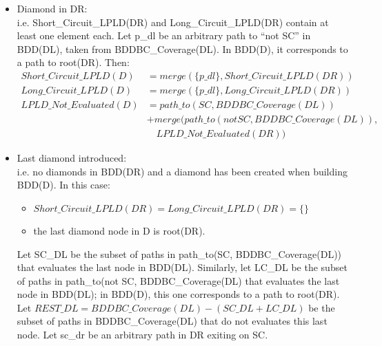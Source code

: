 \documentclass[a4paper,12pt,twoside]{article}
\begin{document}
\begin{description}
\begin{itemize}
  \item Diamond in DR:\\
    i.e. Short\_Circuit\_LPLD(DR) and Long\_Circuit\_LPLD(DR) contain at least
    one element each.
    Let p\_dl be an arbitrary path to ``not SC'' in BDD(DL), taken from
    BDDBC\_Coverage(DL). In BDD(D), it corresponds to a path to root(DR).
    Then:
    \begin{align*}
    Short\_Circuit\_LPLD(D) & = merge(\{p\_dl\}, Short\_Circuit\_LPLD(DR))\\
    Long\_Circuit\_LPLD(D)  & = merge(\{p\_dl\}, Long\_Circuit\_LPLD(DR))\\
    LPLD\_Not\_Evaluated(D) & = path\_to(SC, BDDBC\_Coverage(DL))\\
                          & + merge(path\_to(not SC, BDDBC\_Coverage(DL)),\\
                          & \quad  LPLD\_Not\_Evaluated(DR))
    \end{align*}
  
  \item Last diamond introduced:\\
    i.e. no diamonds in BDD(DR) and a diamond has been created when building
    BDD(D). In this case:
    \begin{itemize}
    \item $Short\_Circuit\_LPLD(DR) = Long\_Circuit\_LPLD(DR) = \{\}$
    \item the last diamond node in D is root(DR).
    \end{itemize}

    Let SC\_DL be the subset of paths in path\_to(SC,
    BDDBC\_Coverage(DL)) that evaluates the last node in BDD(DL).
    Similarly, let LC\_DL be the subset of paths in path\_to(not SC,
    BDDBC\_Coverage(DL) that evaluates the last node in BDD(DL); in
    BDD(D), this one corresponds to a path to root(DR).  Let $REST\_DL
    = BDDBC\_Coverage(DL) - (SC\_DL + LC\_DL)$ be the subset of paths
    in BDDBC\_Coverage(DL) that do not evaluates this last node.  Let
    sc\_dr be an arbitrary path in DR exiting on SC.


\end{itemize}
\end{description}
\end{document}
